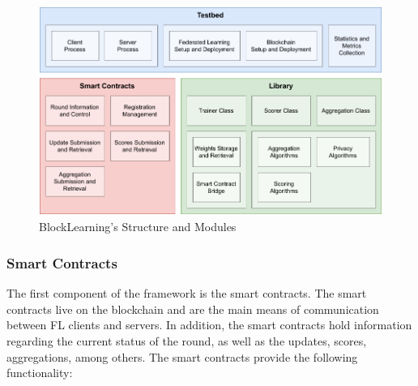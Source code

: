 \begin{figure}[!ht]
    \centering
    \includegraphics[width=1\textwidth]{graphics/modules.pdf}
    \caption{BlockLearning's  Structure and Modules}
    \label{fig:blocklearning_modules}
\end{figure}

\subsubsection{Smart Contracts}\label{meth:smart_contracts}

The first component of the framework is the smart contracts. The smart contracts live on the blockchain and are the main means of communication between FL clients and servers. In addition, the smart contracts hold information regarding the current status of the round, as well as the updates, scores, aggregations, among others. The smart contracts provide the following functionality:

